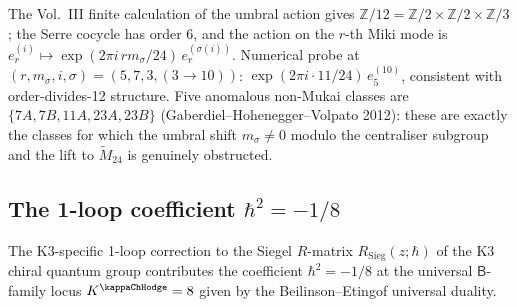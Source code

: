 \begin{remark}
\label{rem:costello-compute-witness}
The Vol.~III finite calculation of the umbral action gives
$\mathbb Z/12 = \mathbb Z/2 \times \mathbb Z/2 \times \mathbb Z/3$;
the Serre cocycle has order $6$, and the action on the $r$-th Miki
mode is
$e^{(i)}_r \mapsto
\exp(2\pi i \, r m_\sigma/24)\, e^{(\sigma(i))}_r$.
Numerical probe at $(r,m_\sigma,i,\sigma) = (5,7,3,(3\to 10))$:
$\exp(2\pi i \cdot 11/24)\, e^{(10)}_5$, consistent with
order-divides-12 structure. Five anomalous non-Mukai classes
are $\{7A,7B,11A,23A,23B\}$ (Gaberdiel--Hohenegger--Volpato
2012): these are exactly the classes for which the umbral
shift $m_\sigma \ne 0$ modulo the centraliser subgroup and the
lift to $\widetilde M_{24}$ is genuinely obstructed.
\end{remark}

\subsection{The 1-loop coefficient
$\hbar^2 = -1/8$}
\label{subsec:costello-hbar-minus-eighth}

\begin{conjecture}[Costello 1-loop coefficient
$\hbar^2 = -1/8$; \ClaimStatusConjectured]
\label{conj:costello-hbar-minus-eighth}
The K3-specific 1-loop correction to the Siegel $R$-matrix
$R_{\mathrm{Sieg}}(z;\hbar)$ of the K3 chiral quantum group
contributes the coefficient $\hbar^2 = -1/8$ at the universal
$\mathsf{B}$-family locus $K^{\kappaChHodge} = 8$
given by the Beilinson--Etingof universal duality.
\end{conjecture}

